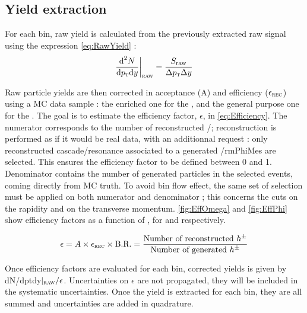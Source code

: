 \subsection{Yield extraction}
\label{sec:Section04.c-}

For each \pT bin, raw yield is calculated from the previously extracted raw signal using the expression \eq \ref{eq:RawYield} :
\begin{equation}
\frac{\text{d}^2 N}{\text{d}p_{\text{\textsc{t}}} \text{d} y} \bigg\rvert_\textsc{raw} = \frac{S_\text{raw}}{\Delta p_{\text{\textsc{t}}} \Delta y}
\end{equation}\label{eq:RawYield}

Raw particle yields are then corrected in acceptance (A) and efficiency ($\epsilon_\textsc{rec}$) using a MC data sample : the enriched one for the \rmOmega, and the general purpose one for the \rmPhiMes. The goal is to estimate the efficiency factor, $\epsilon$, in \eq \ref{eq:Efficiency}. The numerator corresponds to the number of reconstructed \rmOmega/\rmPhiMes; reconstruction is performed as if it would be real data, with an additionnal request : only reconstructed cascade/resonance associated to a generated \rmOmega/rmPhiMes are selected. This ensures the efficiency factor to be defined between 0 and 1. Denominator contains the number of generated particles in the selected events, coming directly from MC truth. To avoid bin flow effect, the same set of selection must be applied on both numerator and denominator ; this concerns the cuts on the rapidity and on the transverse momentum. \fig \ref{fig:EffOmega} and \ref{fig:EffPhi} show efficiency factors as a function of \pT, for \rmOmega and \rmPhiMes respectively.

\begin{equation}
\epsilon = A\times \epsilon_\textsc{rec} \times \text{B.R.} = \frac{\text{Number of reconstructed \ensuremath{h^{\pm}}}}{\text{Number of generated \ensuremath{h^{\pm}}}}
\end{equation}
\label{eq:Efficiency}

Once efficiency factors are evaluated for each \pT bin, corrected yields is given by dN/dptdy$|_\textsc{raw}/\epsilon$. Uncertainties on $\epsilon$ are not propagated, they will be included in the systematic uncertainties. Once the yield is extracted for each \pT bin, they are all summed and uncertainties are added in quadrature. 

